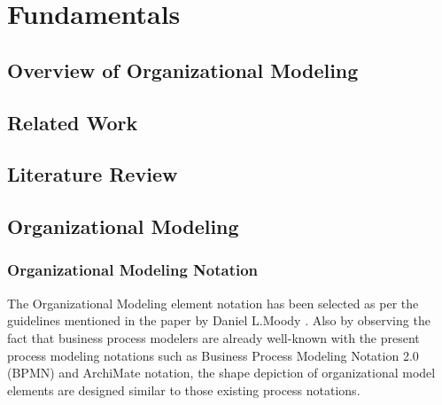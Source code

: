 \chapter{Fundamentals}
\label{chap:fundamentals}

\section{Overview of Organizational Modeling}
\label{sec:overvieworgmodel}

\section{Related Work}
\label{sec:relatedwork}

\section{Literature Review}
\label{sec:literaturereview}


\section{Organizational Modeling}
\label{sec:orgModeling}

\subsection{Organizational Modeling Notation}
\hspace{4ex} The Organizational Modeling element notation has been selected as per the guidelines mentioned in the paper by Daniel L.Moody \cite{Moody2009}. Also by observing  the fact that business process modelers are already well-known with the present process modeling notations such as Business Process Modeling Notation 2.0 (BPMN) \cite{bpm2011} and ArchiMate notation\cite{arc2013}, the shape depiction of organizational model elements are designed similar to those existing process notations. 

